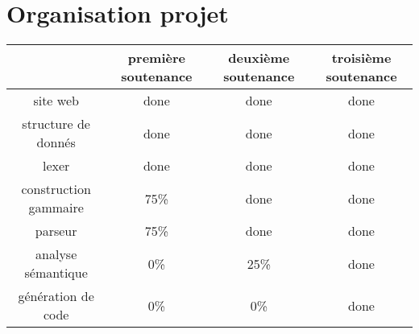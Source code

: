 \chapter{Organisation projet}

\begin{tabular}{|c|c|c|c|}
\hline
                        & première soutenance & deuxième soutenance & troisième
                        soutenance \\ \hline

site web                & done                & done                & done \\
\hline
structure de donnés     & done                & done                & done \\
\hline
lexer                   & done                & done                & done \\
\hline
construction gammaire   & 75\%                & done                & done \\
\hline
parseur                 & 75\%                & done                & done \\
\hline
analyse sémantique      & 0\%                 & 25\%                & done \\
\hline
génération de code      & 0\%                 & 0\%                 & done \\
\hline

\end{tabular}
